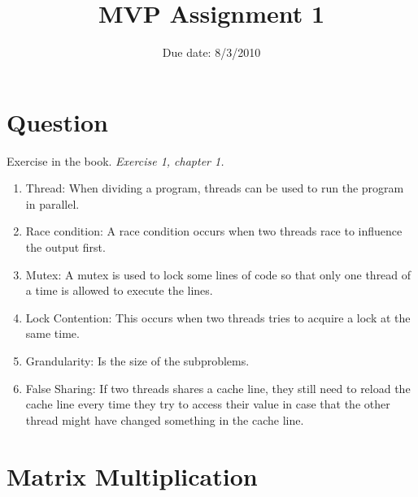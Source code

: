 \documentclass{article}
\title{MVP Assignment 1}
\date{Due date: 8/3/2010}
\begin{document}
\maketitle

\newcommand{\question}[1]{#1}
\newcommand{\answer}[1]{}


%
%
\answer{
\begin{flushleft}
{\bf Group room: 2.1.57}
{\bf Group number:}
\end{flushleft}
}

\section{Question}

\begin{ExerciseList}
\Exercise Exercise in the book.
\Question \emph{Exercise 1, chapter 1.}
\Answer
\begin{enumerate}
	\item Thread: When dividing a program, threads can be used to run the program in parallel.
	\item Race condition: A race condition occurs when two threads race to influence the output first. 
	\item Mutex: A mutex is used to lock some lines of code so that only one thread of a time is allowed to execute the lines.
	\item Lock Contention: This occurs when two threads tries to acquire a lock at the same time.
	\item Grandularity: Is the size of the subproblems.
	\item False Sharing: If two threads shares a cache line, they still need to reload the cache line every time they try to access their value in case that 
	the other thread might have changed something in the cache line.
\end{enumerate}

\end{ExerciseList}

\section{Matrix Multiplication}
\end{document}
